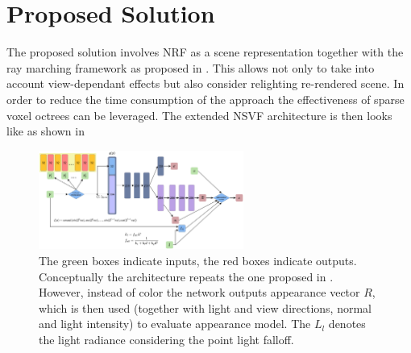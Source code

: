 \documentclass[english]{article}
\begin{document}


\section{Proposed Solution}

The proposed solution involves NRF as a scene representation together with the ray marching framework as proposed in \cite{nrf2020}. This allows not only to take into account view-dependant effects but also consider relighting re-rendered scene. In order to reduce the time consumption of the approach the effectiveness of sparse voxel octrees \cite{nsvf2020} can be leveraged. The extended NSVF architecture is then looks like as shown in 


\begin{figure}[t]
    \centering
    \includegraphics[width=0.6\textwidth]{img/mlp_nsvfnrf_explicit.png}
    \caption{The green boxes indicate inputs, the red boxes indicate outputs.
    Conceptually the architecture repeats the one proposed in \cite{nsvf2020}. However, instead of color the network outputs appearance vector $R$, which is then used (together with light and view directions, normal and light intensity) to evaluate appearance model. The $L_l$ denotes the light radiance considering the point light falloff.}
    \label{fig:mlp_nsvfnrf_explicit}
\end{figure}

\end{document}
